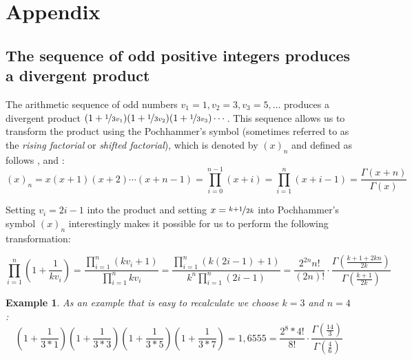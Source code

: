 \documentclass[12pt]{amsart}
\newtheorem{example}[theorem]{Example}
\theoremstyle{definition}
\begin{document}

\newpage
\section{Appendix}

\vspace{1em}
\subsection{The sequence of odd positive integers produces a divergent product}
\label{appx:pochhammer}
The arithmetic sequence of odd numbers $v_1=1,v_2=3,v_3=5,\ldots$ produces a divergent product $(1+\nicefrac{1}{3v_1})(1+\nicefrac{1}{3v_2})(1+\nicefrac{1}{3v_3})\cdots$. This sequence allows us to transform the product using the Pochhammer’s symbol (sometimes referred to as the \textit{rising factorial} or \textit{shifted factorial}), which is denoted by $(x)_n$ and defined as follows \cite{Ref_Zwillinger_Kokoska}, \cite[p.~679]{Ref_Brychkov} and \cite[p.~1005]{Ref_Trott}:
\[
(x)_n=x(x+1)(x+2)\cdots(x+n-1)=\prod_{i=0}^{n-1}(x+i)=\prod_{i=1}^{n}(x+i-1)=\frac{\Gamma(x+n)}{\Gamma(x)}
\]

Setting $v_i=2i-1$ into the product and setting $x=\nicefrac{k+1}{2k}$ into Pochhammer’s symbol $(x)_n$ interestingly makes it possible for us to perform the following transformation:

\begin{equation}
\label{eq:pochhammer}
\prod_{i=1}^{n}\left(1+\frac{1}{kv_i}\right)
=\frac{\prod_{i=1}^{n}(kv_i+1)}{\prod_{i=1}^{n}kv_i}
=\frac{\prod_{i=1}^{n}\left(k(2i-1)+1\right)}{k^n\prod_{i=1}^{n}(2i-1)}
=\frac{2^{2n}n!}{(2n)!}\cdot\frac{\Gamma\left(\frac{k+1+2kn}{2k}\right)}{\Gamma\left(\frac{k+1}{2k}\right)}
\end{equation}

\par\medskip
\begin{example}
	As an example that is easy to recalculate we choose $k=3$ and $n=4$:
	\[
	\left(1+\frac{1}{3*1}\right)\left(1+\frac{1}{3*3}\right)\left(1+\frac{1}{3*5}\right)\left(1+\frac{1}{3*7}\right)=1,6555=\frac{2^8*4!}{8!}\cdot\frac{\Gamma(\frac{14}{3})}{\Gamma(\frac{4}{6})}
	\]
\end{example}
\end{document}
